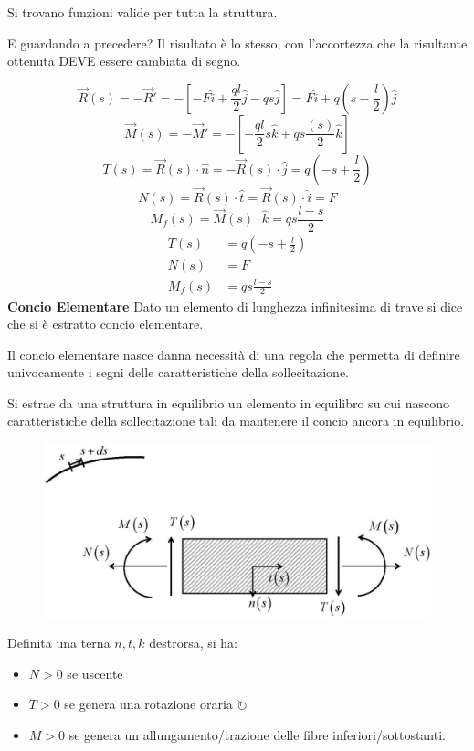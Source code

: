 \documentclass{article}
\begin{document}
\begin{adjustwidth}{2in}{}
	Si trovano funzioni valide per tutta la struttura. \newline 
	
	E guardando a precedere? Il risultato è lo stesso, con l'accortezza che la risultante ottenuta DEVE essere cambiata di segno.
	
	\[\vec{R}(s) = -\vec{R}' = -\left[ -F\hat{i} + \frac{ql}{2} \hat{j} - qs \hat{j}\right]  = F\hat{i} + q\left( s- \frac{l}{2}\right) \hat{j}	\]
	\[\vec{M}(s) = -\vec{M}' = -\left[ -\frac{ql}{2}s \hat{k}  + qs\frac{(s)}{2} \hat{k}\right] \]
	\[
	T(s) = \vec{R}(s) \cdot \hat{n} = -\vec{R}(s) \cdot \hat{j} = q\left( -s + \frac{l}{2}\right) 
	\]
		\[
	N(s) = \vec{R}(s) \cdot \hat{t} = \vec{R}(s) \cdot \hat{i} = F
	\]
	\[
	M_f(s) = \vec{M}(s) \cdot \hat{k} = qs \frac{l-s}{2}
	\]
	\[\boxed{\begin{aligned}
			T(s) & =  q\left( -s + \frac{l}{2}\right)  \\ N(s) & =  F \\ M_f(s) & = qs \frac{l-s}{2}
	\end{aligned}}\] 
\newpage
{\Large \textbf{Concio Elementare}} \mbox{} \newline	
	Dato un elemento di lunghezza infinitesima di trave si dice che si è estratto concio elementare.
	
	Il concio elementare nasce danna necessità di una regola che permetta di definire univocamente i segni delle caratteristiche della sollecitazione. \newline 
	
	Si estrae da una struttura in equilibrio un elemento in equilibro su cui nascono  caratteristiche della sollecitazione tali da mantenere il concio ancora in equilibrio. 
	
\begin{figure}[H]
	\centering
	\includegraphics[width=0.6\linewidth]{"immagini/1.PARTE5_Pagina_07"}
\end{figure}

	Definita una terna $n, t, k$ destrorsa, si ha:
	\begin{itemize}
		\item $N>0$ se uscente 
		\item $T>0$ se genera una rotazione oraria $ \circlearrowright $
		\item $M>0$ se genera un allungamento/trazione delle fibre inferiori/sottostanti.
	\end{itemize}


\end{adjustwidth}
\end{document}
